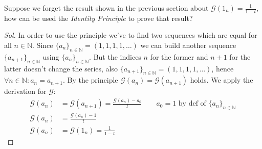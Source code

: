 \begin{exercise}
  Suppose we forget the result shown in the previous section about
  $\mathcal{G} (1_n) = \frac{1}{1-t} $, how can be used the
  \emph{Identity Principle} to prove that result?
\end{exercise}
\begin{proof}[Sol]
  In order to use the principle we've to find two sequences which are
  equal for all $n \in \mathbb{N} $. Since $\{a_n\}_{n\in\mathbb{N} }
  = (1,1,1,1,\ldots)$ we can build another sequence
  $\{a_{n+1}\}_{n\in\mathbb{N} } $ using $\{a_n\}_{n\in\mathbb{N} }
  $. But the indices $n$ for the former and $n+1$ for the latter
  doesn't change the series, also $\{a_{n+1}\}_{n\in\mathbb{N} } =
  (1,1,1,1,\ldots)$, hence $\forall n\in \mathbb{N}: a_n =
  a_{n+1}$. By the principle $\mathcal{G} (a_n) = \mathcal{G}
  (a_{n+1})$ holds. We apply the derivation for $\mathcal{G} $:
  \begin{displaymath}
    \begin{split}
      \mathcal{G} (a_n) &= \mathcal{G} (a_{n+1}) = \frac{\mathcal{G}
        (a_n) - a_0}{t} \quad \quad a_0 = 1 \text{ by def of }
      \{a_n\}_{n\in\mathbb{N} } \\
      \mathcal{G} (a_n) &= \frac{\mathcal{G}
        (a_n) -1}{t} \\
      \mathcal{G} (a_n) &= \mathcal{G} (1_n) = \frac{1}{1-t}
    \end{split}
  \end{displaymath}
 
\end{proof}

